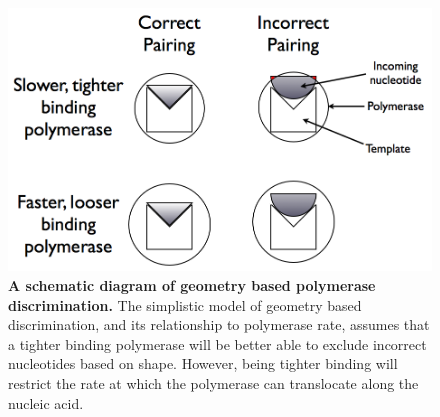 \begin{figure}[ht]
	\centering
		\includegraphics[width=\textwidth]{schematic}
	\caption{\textbf{A schematic diagram of geometry based polymerase discrimination.} The simplistic model of geometry based discrimination, and its relationship to polymerase rate, assumes that a tighter binding polymerase will be better able to exclude incorrect nucleotides based on shape. However, being tighter binding will restrict the rate at which the polymerase can translocate along the nucleic acid.}
	\label{fig:schematic}
\end{figure}

